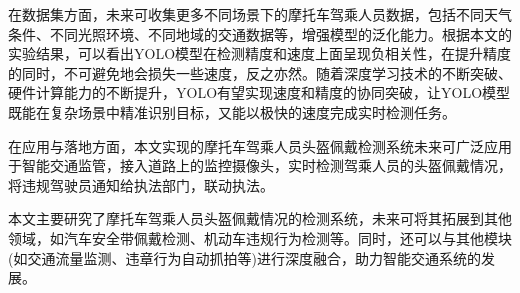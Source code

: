 在数据集方面，未来可收集更多不同场景下的摩托车驾乘人员数据，包括不同天气条件、不同光照环境、不同地域的交通数据等，增强模型的泛化能力。根据本文的实验结果，可以看出YOLO模型在检测精度和速度上面呈现负相关性，在提升精度的同时，不可避免地会损失一些速度，反之亦然。随着深度学习技术的不断突破、硬件计算能力的不断提升，YOLO有望实现速度和精度的协同突破，让YOLO模型既能在复杂场景中精准识别目标，又能以极快的速度完成实时检测任务。

在应用与落地方面，本文实现的摩托车驾乘人员头盔佩戴检测系统未来可广泛应用于智能交通监管，接入道路上的监控摄像头，实时检测驾乘人员的头盔佩戴情况，将违规驾驶员通知给执法部门，联动执法。

本文主要研究了摩托车驾乘人员头盔佩戴情况的检测系统，未来可将其拓展到其他领域，如汽车安全带佩戴检测、机动车违规行为检测等。同时，还可以与其他模块(如交通流量监测、违章行为自动抓拍等)进行深度融合，助力智能交通系统的发展。

